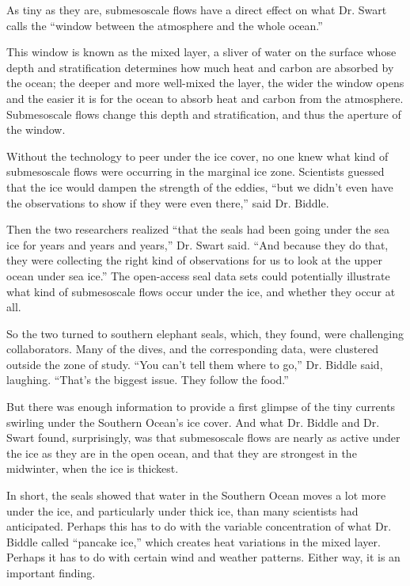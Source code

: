 As tiny as they are, submesoscale flows have a direct effect on what Dr.
Swart calls the ``window between the atmosphere and the whole ocean.''

This window is known as the mixed layer, a sliver of water on the
surface whose depth and stratification determines how much heat and
carbon are absorbed by the ocean; the deeper and more well-mixed the
layer, the wider the window opens and the easier it is for the ocean to
absorb heat and carbon from the atmosphere. Submesoscale flows change
this depth and stratification, and thus the aperture of the window.

Without the technology to peer under the ice cover, no one knew what
kind of submesoscale flows were occurring in the marginal ice zone.
Scientists guessed that the ice would dampen the strength of the eddies,
``but we didn't even have the observations to show if they were even
there,'' said Dr. Biddle.

Then the two researchers realized ``that the seals had been going under
the sea ice for years and years and years,'' Dr. Swart said. ``And
because they do that, they were collecting the right kind of
observations for us to look at the upper ocean under sea ice.'' The
open-access seal data sets could potentially illustrate what kind of
submesoscale flows occur under the ice, and whether they occur at all.

So the two turned to southern elephant seals, which, they found, were
challenging collaborators. Many of the dives, and the corresponding
data, were clustered outside the zone of study. ``You can't tell them
where to go,'' Dr. Biddle said, laughing. ``That's the biggest issue.
They follow the food.''

But there was enough information to provide a first glimpse of the tiny
currents swirling under the Southern Ocean's ice cover. And what Dr.
Biddle and Dr. Swart found, surprisingly, was that submesoscale flows
are nearly as active under the ice as they are in the open ocean, and
that they are strongest in the midwinter, when the ice is thickest.

In short, the seals showed that water in the Southern Ocean moves a lot
more under the ice, and particularly under thick ice, than many
scientists had anticipated. Perhaps this has to do with the variable
concentration of what Dr. Biddle called ``pancake ice,'' which creates
heat variations in the mixed layer. Perhaps it has to do with certain
wind and weather patterns. Either way, it is an important finding.

